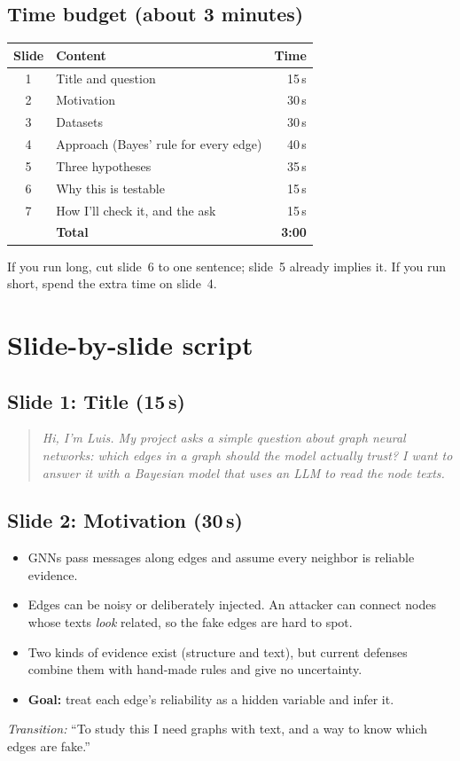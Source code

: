 \documentclass[11pt]{article}
\newcommand{\say}[1]{\begin{quote}\itshape #1\end{quote}}
\begin{document}
\subsection*{Time budget (about 3 minutes)}
\begin{center}
\begin{tabular}{clr}
\toprule
Slide & Content & Time \\
\midrule
1 & Title and question & 15\,s \\
2 & Motivation & 30\,s \\
3 & Datasets & 30\,s \\
4 & Approach (Bayes' rule for every edge) & 40\,s \\
5 & Three hypotheses & 35\,s \\
6 & Why this is testable & 15\,s \\
7 & How I'll check it, and the ask & 15\,s \\
\midrule
 & \textbf{Total} & \textbf{3:00} \\
\bottomrule
\end{tabular}
\end{center}
If you run long, cut slide~6 to one sentence; slide~5 already implies it. If you run short,
spend the extra time on slide~4.

\section{Slide-by-slide script}

\subsection*{Slide 1: Title (15\,s)}
\say{Hi, I'm Luis. My project asks a simple question about graph neural networks: which edges
in a graph should the model actually trust? I want to answer it with a Bayesian model that
uses an LLM to read the node texts.}

\subsection*{Slide 2: Motivation (30\,s)}
\begin{itemize}
  \item GNNs pass messages along edges and assume every neighbor is reliable evidence.
  \item Edges can be noisy or deliberately injected. An attacker can connect nodes whose texts
        \emph{look} related, so the fake edges are hard to spot.
  \item Two kinds of evidence exist (structure and text), but current defenses combine them
        with hand-made rules and give no uncertainty.
  \item \textbf{Goal:} treat each edge's reliability as a hidden variable and infer it.
\end{itemize}
\emph{Transition:} ``To study this I need graphs with text, and a way to know which edges are
fake.''
\end{document}
